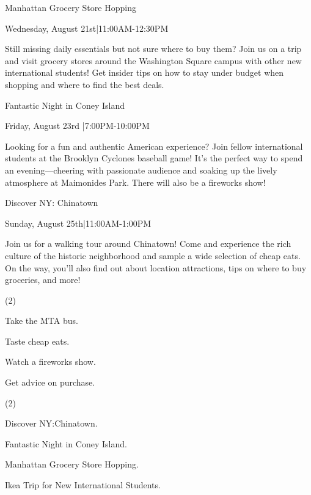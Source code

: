 \documentclass{英语试卷}
\begin{document}
\par Manhattan Grocery Store Hopping\par
\par Wednesday, August 21st|11:00AM-12:30PM\par
\par Still missing daily essentials but not sure where to buy them? Join us on a trip and visit grocery stores around the Washington Square campus with other new international students! Get insider tips on how to stay under budget when shopping and where to find the best deals.\par
\par Fantastic Night in Coney Island\par
\par Friday, August 23rd |7:00PM-10:00PM\par
\par Looking for a fun and authentic American experience? Join fellow international students at the Brooklyn Cyclones baseball game! It's the perfect way to spend an evening—cheering with passionate audience and soaking up the lively atmosphere at Maimonides Park. There will also be a fireworks show!\par
\par Discover NY: Chinatown\par
\par Sunday, August 25th|11:00AM-1:00PM\par
\par Join us for a walking tour around Chinatown! Come and experience the rich culture of the historic neighborhood and sample a wide selection of cheap eats. On the way, you'll also find out about location attractions, tips on where to buy groceries, and more!\par
{}
\begin{choices}(2)
  \item Take the MTA bus.
  \item Taste cheap eats.
  \item Watch a fireworks show.
  \item Get advice on purchase.
\end{choices}
\begin{choices}(2)
  \item Discover NY:Chinatown.
  \item Fantastic Night in Coney Island.
  \item Manhattan Grocery Store Hopping.
  \item Ikea Trip for New International Students.
\end{choices}
\end{document}
